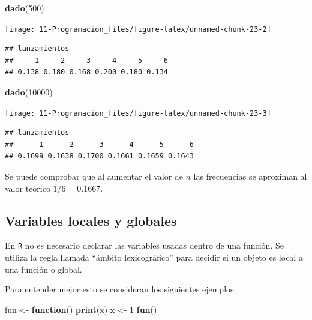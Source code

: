 \documentclass[]{book}
\newenvironment{Shaded}{\begin{snugshade}}{\end{snugshade}}
\newcommand{\KeywordTok}[1]{\textcolor[rgb]{0.13,0.29,0.53}{\textbf{#1}}}
\newcommand{\DecValTok}[1]{\textcolor[rgb]{0.00,0.00,0.81}{#1}}
\newcommand{\StringTok}[1]{\textcolor[rgb]{0.31,0.60,0.02}{#1}}
\newcommand{\ControlFlowTok}[1]{\textcolor[rgb]{0.13,0.29,0.53}{\textbf{#1}}}
\newcommand{\NormalTok}[1]{#1}
\begin{document}
\begin{Shaded}
\begin{Highlighting}[]
\KeywordTok{dado}\NormalTok{(}\DecValTok{500}\NormalTok{)}
\end{Highlighting}
\end{Shaded}

\begin{center}\texttt{[image: 11-Programacion\_files/figure-latex/unnamed-chunk-23-2]} \end{center}

\begin{verbatim}
## lanzamientos
##     1     2     3     4     5     6 
## 0.138 0.180 0.168 0.200 0.180 0.134
\end{verbatim}

\begin{Shaded}
\begin{Highlighting}[]
\KeywordTok{dado}\NormalTok{(}\DecValTok{10000}\NormalTok{)}
\end{Highlighting}
\end{Shaded}

\begin{center}\texttt{[image: 11-Programacion\_files/figure-latex/unnamed-chunk-23-3]} \end{center}

\begin{verbatim}
## lanzamientos
##      1      2      3      4      5      6 
## 0.1699 0.1638 0.1700 0.1661 0.1659 0.1643
\end{verbatim}

Se puede comprobar que al aumentar el valor de \(n\) las frecuencias se
aproximan al valor teórico \(1/6=0.1667\).

\subsection{Variables locales y
globales}\label{variables-locales-y-globales}

En \texttt{R} no es necesario declarar las variables usadas dentro de
una función. Se utiliza la regla llamada ``ámbito lexicográfico'' para
decidir si un objeto es local a una función o global.

Para entender mejor esto se consideran los siguientes ejemplos:

\begin{Shaded}
\begin{Highlighting}[]
\NormalTok{fun <-}\StringTok{ }\ControlFlowTok{function}\NormalTok{() }\KeywordTok{print}\NormalTok{(x)}
\NormalTok{x <-}\StringTok{ }\DecValTok{1}
\KeywordTok{fun}\NormalTok{()}
\end{Highlighting}
\end{Shaded}
\end{document}
